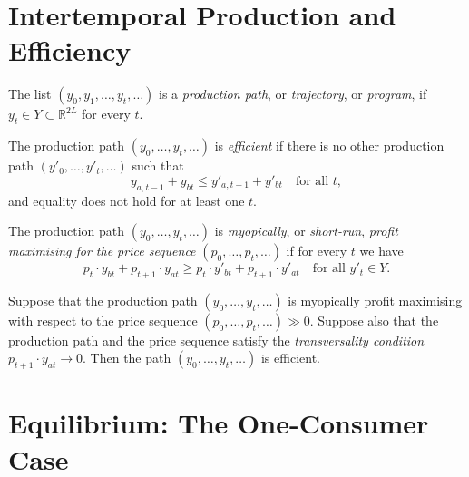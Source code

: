 \addtocounter{section}{1}

\addtocounter{section}{1}

\section{Intertemporal Production and Efficiency}

\begin{defn}
    The list $(y_0, y_1, \dots, y_t, \dots)$ is a \emph{production path}, or \emph{trajectory}, or \emph{program}, if $y_t \in Y \subset \mathbb{R}^{2L}$ for every $t$.
\end{defn}

\begin{defn}
    The production path $(y_0, \dots, y_t, \dots)$ is \emph{efficient} if there is no other production path $(y'_0, \dots, y'_t, \dots)$ such that 
    \begin{equation*}
        y_{a, t-1} + y_{bt} \leq y'_{a, t-1} + y'_{bt} \quad \text{for all } t,
    \end{equation*}
    and equality does not hold for at least one $t$.
\end{defn}

\begin{defn}
    The production path $(y_0, \dots, y_t, \dots)$ is \emph{myopically}, or \emph{short-run}, \emph{profit maximising for the price sequence} $(p_0, \dots, p_t, \dots)$ if for every $t$ we have
    \begin{equation*}
        p_t \cdot y_{bt} + p_{t + 1} \cdot y_{at} \geq p_t \cdot y'_{bt} + p_{t + 1} \cdot y'_{at} \quad \text{for all } y'_t \in Y.
    \end{equation*}
\end{defn}

\begin{prop}
    Suppose that the production path $(y_0, \dots, y_t, \dots)$ is myopically profit maximising with respect to the price sequence $(p_0, \dots, p_t, \dots) \gg 0$. Suppose also that the production path and the price sequence satisfy the \emph{transversality condition} $p_{t + 1} \cdot y_{at} \rightarrow 0$. Then the path $(y_0, \dots, y_t, \dots)$ is efficient.
\end{prop}


\section{Equilibrium: The One-Consumer Case}

